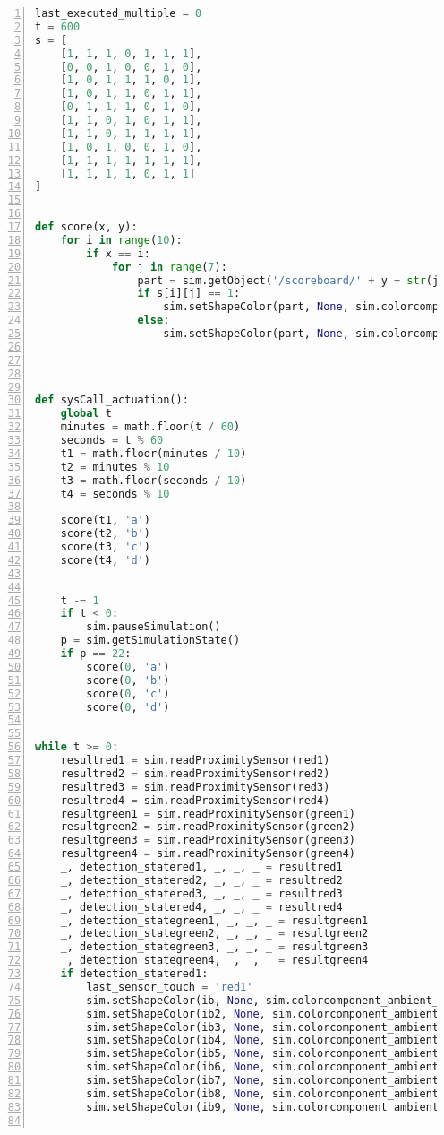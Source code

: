 \begin{lstlisting}[language=Python, frame=single, numbers=left, captionpos=b, basicstyle=\ttfamily\small, showstringspaces=false, breaklines=true, tabsize=4, xleftmargin=15pt]
last_executed_multiple = 0
t = 600
s = [
    [1, 1, 1, 0, 1, 1, 1],
    [0, 0, 1, 0, 0, 1, 0],
    [1, 0, 1, 1, 1, 0, 1],
    [1, 0, 1, 1, 0, 1, 1],
    [0, 1, 1, 1, 0, 1, 0],
    [1, 1, 0, 1, 0, 1, 1],
    [1, 1, 0, 1, 1, 1, 1],
    [1, 0, 1, 0, 0, 1, 0],
    [1, 1, 1, 1, 1, 1, 1],
    [1, 1, 1, 1, 0, 1, 1]
]
 
 
def score(x, y):
    for i in range(10):
        if x == i:
            for j in range(7):
                part = sim.getObject('/scoreboard/' + y + str(j))
                if s[i][j] == 1:
                    sim.setShapeColor(part, None, sim.colorcomponent_ambient_diffuse, [1, 1, 1])
                else:
                    sim.setShapeColor(part, None, sim.colorcomponent_ambient_diffuse, [0, 0, 0])
 
 
 
 
def sysCall_actuation():
    global t
    minutes = math.floor(t / 60)
    seconds = t % 60
    t1 = math.floor(minutes / 10)
    t2 = minutes % 10
    t3 = math.floor(seconds / 10)
    t4 = seconds % 10
     
    score(t1, 'a')
    score(t2, 'b')
    score(t3, 'c')
    score(t4, 'd')
 
     
    t -= 1
    if t < 0:
        sim.pauseSimulation()
    p = sim.getSimulationState()
    if p == 22:
        score(0, 'a')
        score(0, 'b')
        score(0, 'c')
        score(0, 'd')
 
 
while t >= 0:
    resultred1 = sim.readProximitySensor(red1)
    resultred2 = sim.readProximitySensor(red2)
    resultred3 = sim.readProximitySensor(red3)
    resultred4 = sim.readProximitySensor(red4)
    resultgreen1 = sim.readProximitySensor(green1)
    resultgreen2 = sim.readProximitySensor(green2)
    resultgreen3 = sim.readProximitySensor(green3)
    resultgreen4 = sim.readProximitySensor(green4)
    _, detection_statered1, _, _, _ = resultred1
    _, detection_statered2, _, _, _ = resultred2
    _, detection_statered3, _, _, _ = resultred3
    _, detection_statered4, _, _, _ = resultred4
    _, detection_stategreen1, _, _, _ = resultgreen1
    _, detection_stategreen2, _, _, _ = resultgreen2
    _, detection_stategreen3, _, _, _ = resultgreen3
    _, detection_stategreen4, _, _, _ = resultgreen4
    if detection_statered1:
        last_sensor_touch = 'red1'
        sim.setShapeColor(ib, None, sim.colorcomponent_ambient_diffuse, [1, 0, 0])
        sim.setShapeColor(ib2, None, sim.colorcomponent_ambient_diffuse, [1, 0, 0])
        sim.setShapeColor(ib3, None, sim.colorcomponent_ambient_diffuse, [1, 1, 1])
        sim.setShapeColor(ib4, None, sim.colorcomponent_ambient_diffuse, [1, 1, 1])
        sim.setShapeColor(ib5, None, sim.colorcomponent_ambient_diffuse, [0, 0, 0])
        sim.setShapeColor(ib6, None, sim.colorcomponent_ambient_diffuse, [1, 1, 1])
        sim.setShapeColor(ib7, None, sim.colorcomponent_ambient_diffuse, [1, 1, 1])
        sim.setShapeColor(ib8, None, sim.colorcomponent_ambient_diffuse, [0, 0, 0])
        sim.setShapeColor(ib9, None, sim.colorcomponent_ambient_diffuse, [1, 1, 1])
 

\end{lstlisting}
